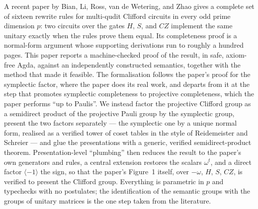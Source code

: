 A recent paper by Bian, Li, Ross, van de Wetering, and Zhao gives a
complete set of sixteen rewrite rules for multi-qudit Clifford circuits
in every odd prime dimension $p$: two circuits over the gates $H$, $S$,
and $CZ$ implement the same unitary exactly when the rules prove them
equal.  Its completeness proof is a normal-form argument whose
supporting derivations run to roughly a hundred pages.  This paper
reports a machine-checked proof of the result, in safe, axiom-free
Agda, against an independently constructed semantics, together with the
method that made it feasible.  The formalisation follows the paper's
proof for the symplectic factor, where the paper does its real work,
and departs from it at the step that promotes symplectic completeness
to projective completeness, which the paper performs ``up to Paulis''.
We instead factor the projective Clifford group as a semidirect product
of the projective Pauli group by the symplectic group, present the two
factors separately --- the symplectic one by a unique normal form,
realised as a verified tower of coset tables in the style of
Reidemeister and Schreier --- and glue the presentations with a
generic, verified semidirect-product theorem.  Presentation-level
``plumbing'' then reduces the result to the paper's own generators and
rules, a central extension restores the scalars $\omega^t$, and a direct
factor $\langle -1\rangle$ the sign, so that the paper's Figure~1 itself,
over $-\omega$, $H$, $S$, $CZ$, is verified to present the Clifford group.
Everything is
parametric in $p$ and typechecks with no postulates; the identification
of the semantic groups with the groups of unitary matrices is the one
step taken from the literature.
